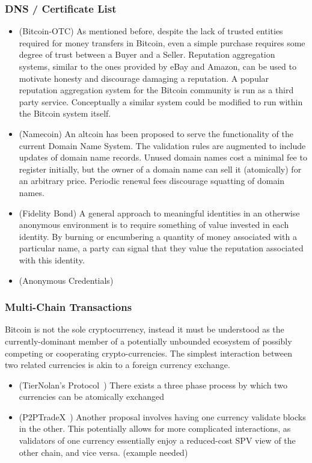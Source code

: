 \subsubsection{DNS / Certificate List}
\begin{itemize}
\item (Bitcoin-OTC) As mentioned before, despite the lack of trusted entities required for money transfers in Bitcoin, even a simple purchase requires some degree of trust between a Buyer and a Seller. Reputation aggregation systems, similar to the ones provided by eBay and Amazon, can be used to motivate honesty and discourage damaging a reputation. A popular reputation aggregation system for the Bitcoin community is run as a third party service. Conceptually a similar system could be modified to run within the Bitcoin system itself.
\item (Namecoin) An altcoin has been proposed to serve the functionality of the current Domain Name System. The validation rules are augmented to include updates of domain name records. Unused domain names cost a minimal fee to register initially, but the owner of a domain name can sell it (atomically) for an arbitrary price. Periodic renewal fees discourage squatting of domain names.
\item (Fidelity Bond) A general approach to meaningful identities in an otherwise anonymous environment is to require something of value invested in each identity. By burning or encumbering a quantity of money associated with a particular name, a party can signal that they value the reputation associated with this identity.
\item (Anonymous Credentials)
\end{itemize}

\subsubsection{Multi-Chain Transactions}
Bitcoin is not the sole cryptocurrency, instead it must be understood as the currently-dominant member of a potentially unbounded ecosystem of possibly competing or cooperating crypto-currencies. The simplest interaction between two related currencies is akin to a foreign currency exchange.

\begin{itemize}
\item (TierNolan's Protocol~\cite{tiernolan}) There exists a three phase process by which two currencies can be atomically exchanged
\item (P2PTradeX~\cite{p2ptradex}) Another proposal involves having one currency validate blocks in the other. This potentially allows for more complicated interactions, as validators of one currency essentially enjoy a reduced-cost SPV view of the other chain, and vice versa. (example needed)
\end{itemize}

